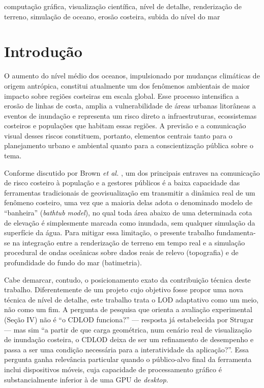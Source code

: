 \documentclass[conference]{IEEEtran}
\begin{document}
\begin{IEEEkeywords}
computação gráfica, visualização científica, nível de detalhe,
renderização de terreno, simulação de oceano, erosão costeira, subida do
nível do mar
\end{IEEEkeywords}

\section{Introdução}

O aumento do nível médio dos oceanos, impulsionado por mudanças
climáticas de origem antrópica, constitui atualmente um dos fenômenos
ambientais de maior impacto sobre regiões costeiras em escala global.
Esse processo intensifica a erosão de linhas de costa, amplia a
vulnerabilidade de áreas urbanas litorâneas a eventos de inundação e
representa um risco direto a infraestruturas, ecossistemas costeiros e
populações que habitam essas regiões. A previsão e a comunicação visual
desses riscos constituem, portanto, elementos centrais tanto para o
planejamento urbano e ambiental quanto para a conscientização pública
sobre o tema.

Conforme discutido por Brown \emph{et al.} \cite{brown2006}, um dos
principais entraves na comunicação de risco costeiro à população e a
gestores públicos é a baixa capacidade das ferramentas tradicionais de
geovisualização em transmitir a dinâmica real de um fenômeno costeiro,
uma vez que a maioria delas adota o denominado modelo de ``banheira''
(\emph{bathtub model}), no qual toda área abaixo de uma determinada cota
de elevação é simplesmente marcada como inundada, sem qualquer simulação
da superfície da água. Para mitigar essa limitação, o presente trabalho
fundamenta-se na integração entre a renderização de terreno em tempo real
e a simulação procedural de ondas oceânicas sobre dados reais de relevo
(topografia) e de profundidade do fundo do mar (batimetria).

Cabe demarcar, contudo, o posicionamento exato da contribuição técnica
deste trabalho. Diferentemente de um projeto cujo objetivo fosse propor
uma nova técnica de nível de detalhe, este trabalho trata o LOD adaptativo
como um meio, não como um fim. A pergunta de pesquisa que orienta a
avaliação experimental (Seção IV) não é ``o CDLOD funciona?'' --- resposta
já estabelecida por Strugar \cite{strugar2009} --- mas sim ``a partir de
que carga geométrica, num cenário real de visualização de inundação
costeira, o CDLOD deixa de ser um refinamento de desempenho e passa a ser
uma condição necessária para a interatividade da aplicação?''. Essa
pergunta ganha relevância particular quando o público-alvo final da
ferramenta inclui dispositivos móveis, cuja capacidade de processamento
gráfico é substancialmente inferior à de uma GPU de \emph{desktop}.
\end{document}
